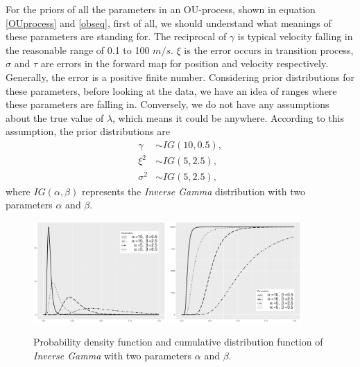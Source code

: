 For the priors of all the parameters in an OU-process, shown in equation \eqref{OUprocess} and \eqref{obseq}, first of all, we should understand what meanings of these parameters are standing for. The reciprocal of $\gamma$ is typical velocity falling in the reasonable range of 0.1 to 100 $m/s$. $\xi$ is the error occurs in transition process, $\sigma$ and $\tau$ are errors in the forward map for position and velocity respectively. Generally, the error is a positive finite number. Considering prior distributions for these parameters, before looking at the data, we have an idea of ranges where these parameters are falling in. Conversely, we do not have any assumptions about the true value of $\lambda$, which means it could be anywhere. According to this assumption, the prior distributions are 
\begin{align*}
\gamma   &\sim IG(10,0.5),\\
\xi^2        &\sim IG(5,2.5),\\
\sigma^2 &\sim IG(5,2.5),
\end{align*}
where $IG(\alpha,\beta)$ represents the \textit{Inverse Gamma} distribution with two parameters $\alpha$ and $\beta$. 
\begin{figure}[h]
\centering
\includegraphics[width=0.45\textwidth]{Chapters/05MCMCOU/plots/ggIGPDF.pdf}
\includegraphics[width=0.45\textwidth]{Chapters/05MCMCOU/plots/ggIGCDF.pdf}
\caption{Probability density function and cumulative distribution function of \textit{Inverse Gamma} with two parameters $\alpha$ and $\beta$. }
\label{IGPDFCDF}
\end{figure}


